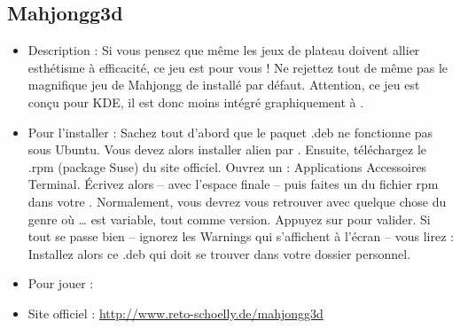 \subsection{Mahjongg3d}
\begin{itemize}
\begingroup
{}
\item Description : Si vous pensez que même les jeux de plateau doivent allier esthétisme à efficacité, ce jeu est pour vous ! Ne rejettez tout de même pas le magnifique jeu de Mahjongg de  installé par défaut. Attention, ce jeu est conçu pour KDE, il est donc moins intégré graphiquement à .{\par}
\endgroup
\item Pour l'installer : Sachez tout d'abord que le paquet .deb ne fonctionne pas sous Ubuntu. Vous devez alors installer alien par . Ensuite, téléchargez le .rpm (package Suse) du site officiel. Ouvrez un  : Applications \FlecheDroite Accessoires \FlecheDroite Terminal. Écrivez alors  -- avec l'espace finale -- puis faites un  du fichier rpm dans votre . Normalement, vous devrez vous retrouver avec quelque chose du genre  où \ldots{} est variable, tout comme version. Appuyez sur  pour valider. Si tout se passe bien -- ignorez les Warnings qui s'affichent à l'écran -- vous lirez : Installez alors ce .deb qui doit se trouver dans votre dossier personnel.{\par}
\item Pour jouer : 
\item Site officiel : \url{http://www.reto-schoelly.de/mahjongg3d}{\par}
\end{itemize}
